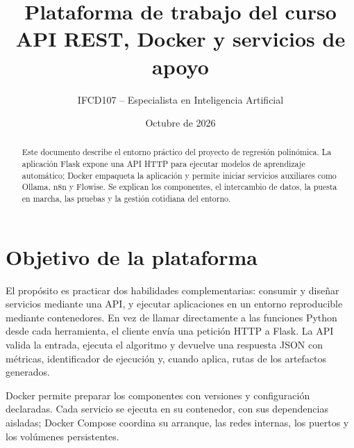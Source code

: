 \documentclass[11pt,a4paper]{article}
\title{Plataforma de trabajo del curso\\\large API REST, Docker y servicios de apoyo}
\author{IFCD107 -- Especialista en Inteligencia Artificial}
\date{Octubre de 2026}
\begin{document}
\maketitle

\begin{abstract}
Este documento describe el entorno práctico del proyecto de regresión polinómica. La aplicación Flask expone una API HTTP para ejecutar modelos de aprendizaje automático; Docker empaqueta la aplicación y permite iniciar servicios auxiliares como Ollama, n8n y Flowise. Se explican los componentes, el intercambio de datos, la puesta en marcha, las pruebas y la gestión cotidiana del entorno.
\end{abstract}

\section{Objetivo de la plataforma}
El propósito es practicar dos habilidades complementarias: consumir y diseñar servicios mediante una API, y ejecutar aplicaciones en un entorno reproducible mediante contenedores. En vez de llamar directamente a las funciones Python desde cada herramienta, el cliente envía una petición HTTP a Flask. La API valida la entrada, ejecuta el algoritmo y devuelve una respuesta JSON con métricas, identificador de ejecución y, cuando aplica, rutas de los artefactos generados.

Docker permite preparar los componentes con versiones y configuración declaradas. Cada servicio se ejecuta en su contenedor, con sus dependencias aisladas; Docker Compose coordina su arranque, las redes internas, los puertos y los volúmenes persistentes.
\end{document}
